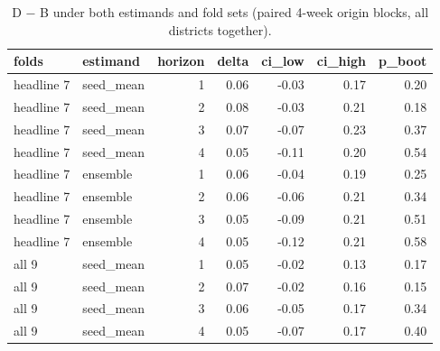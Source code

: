 \begin{table}[t]
\centering
\small
\caption{D − B under both estimands and fold sets (paired 4-week origin blocks, all districts together).}
\label{tab:primary-bootstrap-estimands}
\begin{tabular}{llrrrrr}
\toprule
folds & estimand & horizon & delta & ci\_low & ci\_high & p\_boot \\
\midrule
headline 7 & seed\_mean & 1 & 0.06 & -0.03 & 0.17 & 0.20 \\
headline 7 & seed\_mean & 2 & 0.08 & -0.03 & 0.21 & 0.18 \\
headline 7 & seed\_mean & 3 & 0.07 & -0.07 & 0.23 & 0.37 \\
headline 7 & seed\_mean & 4 & 0.05 & -0.11 & 0.20 & 0.54 \\
headline 7 & ensemble & 1 & 0.06 & -0.04 & 0.19 & 0.25 \\
headline 7 & ensemble & 2 & 0.06 & -0.06 & 0.21 & 0.34 \\
headline 7 & ensemble & 3 & 0.05 & -0.09 & 0.21 & 0.51 \\
headline 7 & ensemble & 4 & 0.05 & -0.12 & 0.21 & 0.58 \\
all 9 & seed\_mean & 1 & 0.05 & -0.02 & 0.13 & 0.17 \\
all 9 & seed\_mean & 2 & 0.07 & -0.02 & 0.16 & 0.15 \\
all 9 & seed\_mean & 3 & 0.06 & -0.05 & 0.17 & 0.34 \\
all 9 & seed\_mean & 4 & 0.05 & -0.07 & 0.17 & 0.40 \\
\bottomrule
\end{tabular}
\end{table}
